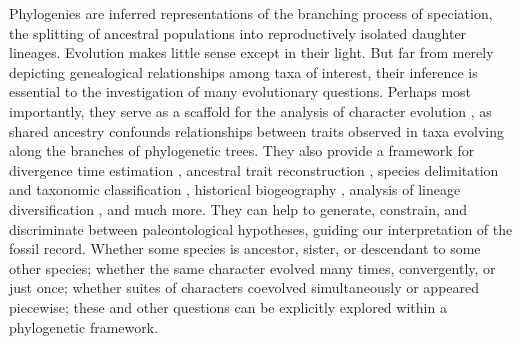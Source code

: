 Phylogenies are inferred representations of the branching process of speciation, the splitting of ancestral populations into reproductively isolated daughter lineages. Evolution makes little sense except in their light. But far from merely depicting genealogical relationships among taxa of interest, their inference is essential to the investigation of many evolutionary questions. Perhaps most importantly, they serve as a scaffold for the analysis of character evolution \citep{felsensteinPhylogeniesComparativeMethod1985}, as shared ancestry confounds relationships between traits observed in taxa evolving along the branches of phylogenetic trees. They also provide a framework for divergence time estimation \citep{glazkoEstimationDivergenceTimes2003, heathBayesianInferenceSpecies2014}, ancestral trait reconstruction \citep{schluterLikelihoodAncestorStates1997, joyAncestralReconstruction2016}, species delimitation and taxonomic classification \citep{rannalaArtScienceSpecies2015}, historical biogeography \citep{donoghueIntegrativeHistoricalBiogeography2003, ronquistPhylogeneticMethodsBiogeography2011}, analysis of lineage diversification \citep{neeReconstructedEvolutionaryProcess1994, morlonPhylogeneticApproachesStudying2014}, and much more. They can help to generate, constrain, and discriminate between paleontological hypotheses, guiding our interpretation of the fossil record. Whether some species is ancestor, sister, or descendant to some other species; whether the same character evolved many times, convergently, or just once; whether suites of characters coevolved simultaneously or appeared piecewise; these and other questions can be explicitly explored within a phylogenetic framework. 


